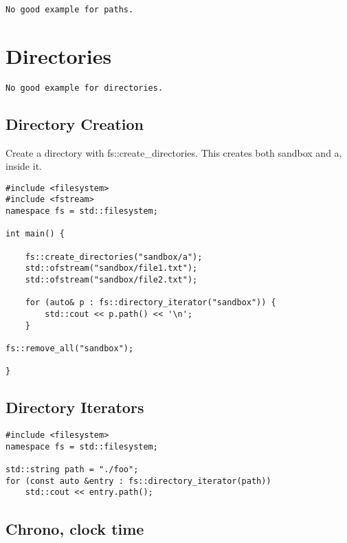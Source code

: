 \begin{verbatim}
No good example for paths.
\end{verbatim}

\section{Directories}

\begin{verbatim}
No good example for directories.
\end{verbatim}

\subsection{Directory Creation}

Create a directory with fs::create\_directories. This creates both sandbox and a, inside it.

\begin{verbatim}
#include <filesystem>
#include <fstream>
namespace fs = std::filesystem;

int main() {

    fs::create_directories("sandbox/a");
    std::ofstream("sandbox/file1.txt");
    std::ofstream("sandbox/file2.txt");

    for (auto& p : fs::directory_iterator("sandbox")) {
        std::cout << p.path() << '\n';
    } 

fs::remove_all("sandbox");

}
\end{verbatim}

\subsection{Directory Iterators}

\begin{verbatim}
#include <filesystem>
namespace fs = std::filesystem;

std::string path = "./foo";
for (const auto &entry : fs::directory_iterator(path))
    std::cout << entry.path();
\end{verbatim}

\subsection{Chrono, clock time}


